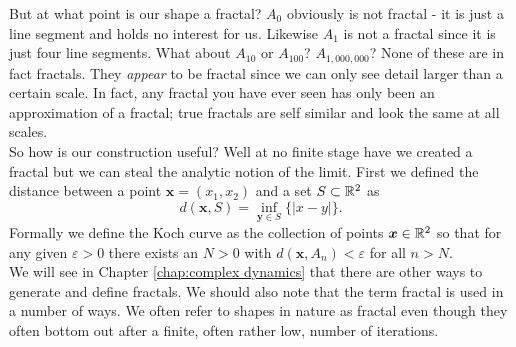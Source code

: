 But at what point is our shape a fractal? \(A_0\) obviously is not fractal - 
it is just a line segment and holds no interest for us. Likewise \(A_1\) is
not a fractal since it is just four line segments. What about \(A_{10}\) or
\(A_{100}\)? \(A_{1,000,000}\)? None of these are in fact fractals. They 
{\em appear} to be fractal since we can only see detail larger than a certain
scale. In fact, any fractal you have ever seen has only been an approximation
of a fractal; true fractals are self similar and look the same at all scales.\\

So how is our construction useful? Well at no finite stage have we created a
fractal but we can steal the analytic notion of the limit. First we defined the
distance between a point \(\bm{x} = (x_1,x_2)\) and a set \(S\subset \mathbb R^2\) as
\[d(\bm{x},S) = \inf_{\bm{y} \in S}{\{|x-y|\}}.\]
Formally we define the Koch curve as the collection of points \(\bm{x} \in
\mathbb R^2\) so that for any given \(\varepsilon > 0\) there exists an \(N > 0\) with
\(d(\bm{x},A_n) < \varepsilon\) for all \(n > N\). \\

We will see in Chapter \ref{chap:complex dynamics} that there are other ways
to generate and define fractals. We should also note that the term fractal is
used in a number of ways. We often refer to shapes in nature as fractal even
though they often bottom out after a finite, often rather low, number of
iterations.

